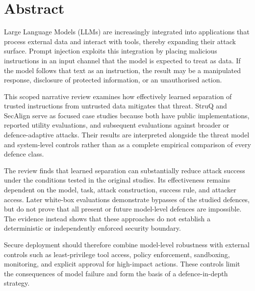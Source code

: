 \section*{Abstract}

Large Language Models (LLMs) are increasingly integrated into applications that
process external data and interact with tools, thereby expanding their attack
surface. Prompt injection exploits this integration by placing malicious
instructions in an input channel that the model is expected to treat as data.
If the model follows that text as an instruction, the result may be a manipulated
response, disclosure of protected information, or an unauthorised action.

This scoped narrative review examines how effectively learned separation of
trusted instructions from untrusted data mitigates that threat. StruQ and
SecAlign serve as focused case studies because both have public implementations,
reported utility evaluations, and subsequent evaluations against broader or
defence-adaptive attacks. Their results are interpreted alongside the threat
model and system-level controls rather than as a complete empirical comparison
of every defence class.

The review finds that learned separation can substantially reduce attack success
under the conditions tested in the original studies. Its effectiveness remains
dependent on the model, task, attack construction, success rule, and attacker
access. Later white-box evaluations demonstrate bypasses of the studied
defences, but do not prove that all present or future model-level defences are
impossible. The evidence instead shows that these approaches do not establish a
deterministic or independently enforced security boundary.

Secure deployment should therefore combine model-level robustness with external
controls such as least-privilege tool access, policy enforcement, sandboxing,
monitoring, and explicit approval for high-impact actions. These controls limit
the consequences of model failure and form the basis of a defence-in-depth
strategy.

